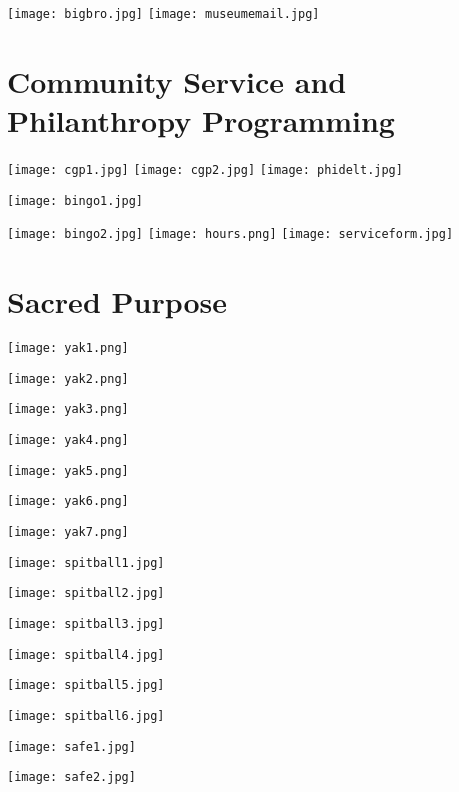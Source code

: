 \documentclass[a4paper,10pt]{article}
\begin{document}
    
    \texttt{[image: bigbro.jpg]}
    \texttt{[image: museumemail.jpg]}
    
    
    
    
    
    
    
    
    
    \newpage
  \section{Community Service and Philanthropy Programming}
    
    \texttt{[image: cgp1.jpg]}
    \texttt{[image: cgp2.jpg]}
    \texttt{[image: phidelt.jpg]}
    
    
    \texttt{[image: bingo1.jpg]}
    
    
    \texttt{[image: bingo2.jpg]}
    \texttt{[image: hours.png]}
    \texttt{[image: serviceform.jpg]}
  
  \newpage
  \section{Sacred Purpose}
    \texttt{[image: yak1.png]}
    
    \texttt{[image: yak2.png]}
    
    \texttt{[image: yak3.png]}
    
    \texttt{[image: yak4.png]}
    
    \texttt{[image: yak5.png]}
    
    \texttt{[image: yak6.png]}
    
    \texttt{[image: yak7.png]}
    
    
    \texttt{[image: spitball1.jpg]}
    
    \texttt{[image: spitball2.jpg]}
    
    \texttt{[image: spitball3.jpg]}
    
    \texttt{[image: spitball4.jpg]}
    
    \texttt{[image: spitball5.jpg]}
    
    \texttt{[image: spitball6.jpg]}
    
    \texttt{[image: safe1.jpg]}
    
    \texttt{[image: safe2.jpg]}
    
\end{document}
